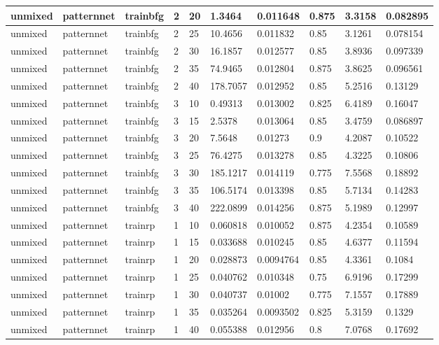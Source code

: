 \begin{longtable}{lllllllll}
unmixed & patternnet & trainbfg & 2 & 20 & 1.3464 & 0.011648 & 0.875 & 3.3158 & 0.082895 \\ \hline 
unmixed & patternnet & trainbfg & 2 & 25 & 10.4656 & 0.011832 & 0.85 & 3.1261 & 0.078154 \\ \hline 
unmixed & patternnet & trainbfg & 2 & 30 & 16.1857 & 0.012577 & 0.85 & 3.8936 & 0.097339 \\ \hline 
unmixed & patternnet & trainbfg & 2 & 35 & 74.9465 & 0.012804 & 0.875 & 3.8625 & 0.096561 \\ \hline 
unmixed & patternnet & trainbfg & 2 & 40 & 178.7057 & 0.012952 & 0.85 & 5.2516 & 0.13129 \\ \hline 
unmixed & patternnet & trainbfg & 3 & 10 & 0.49313 & 0.013002 & 0.825 & 6.4189 & 0.16047 \\ \hline 
unmixed & patternnet & trainbfg & 3 & 15 & 2.5378 & 0.013064 & 0.85 & 3.4759 & 0.086897 \\ \hline 
unmixed & patternnet & trainbfg & 3 & 20 & 7.5648 & 0.01273 & 0.9 & 4.2087 & 0.10522 \\ \hline 
unmixed & patternnet & trainbfg & 3 & 25 & 76.4275 & 0.013278 & 0.85 & 4.3225 & 0.10806 \\ \hline 
unmixed & patternnet & trainbfg & 3 & 30 & 185.1217 & 0.014119 & 0.775 & 7.5568 & 0.18892 \\ \hline 
unmixed & patternnet & trainbfg & 3 & 35 & 106.5174 & 0.013398 & 0.85 & 5.7134 & 0.14283 \\ \hline 
unmixed & patternnet & trainbfg & 3 & 40 & 222.0899 & 0.014256 & 0.875 & 5.1989 & 0.12997 \\ \hline 
unmixed & patternnet & trainrp & 1 & 10 & 0.060818 & 0.010052 & 0.875 & 4.2354 & 0.10589 \\ \hline 
unmixed & patternnet & trainrp & 1 & 15 & 0.033688 & 0.010245 & 0.85 & 4.6377 & 0.11594 \\ \hline 
unmixed & patternnet & trainrp & 1 & 20 & 0.028873 & 0.0094764 & 0.85 & 4.3361 & 0.1084 \\ \hline 
unmixed & patternnet & trainrp & 1 & 25 & 0.040762 & 0.010348 & 0.75 & 6.9196 & 0.17299 \\ \hline 
unmixed & patternnet & trainrp & 1 & 30 & 0.040737 & 0.01002 & 0.775 & 7.1557 & 0.17889 \\ \hline 
unmixed & patternnet & trainrp & 1 & 35 & 0.035264 & 0.0093502 & 0.825 & 5.3159 & 0.1329 \\ \hline 
unmixed & patternnet & trainrp & 1 & 40 & 0.055388 & 0.012956 & 0.8 & 7.0768 & 0.17692 \\ \hline 

\end{longtable}
